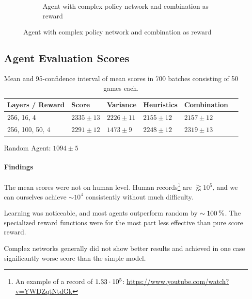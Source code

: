 \documentclass[11pt, fleqn]{article}
\begin{document}
\begin{figure}[h!]
\begin{subfigure}[t]{0.4\linewidth}
		\caption{Agent with complex policy network and combination as reward}
	\end{subfigure}
\end{figure}

\subsection*{Agent Evaluation Scores}
\begin{table}[H]
	\centering
	\begin{tabular}{@{}l|lllll@{}}
		\toprule
		Layers / Reward& Score & Variance & Heuristics & Combination  \\ \midrule 
		256, 16, 4       &   $2335\pm 13$    & $2226\pm 11$       & $2155 \pm 12$ & $2157\pm 12$                                                                                        \\
		256, 100, 50, 4 &  $2291 \pm 12$    &          $1473 \pm 9$&            $2248 \pm 12$ &                                             $2319 \pm 13$                 \\ \bottomrule
	\end{tabular}
\caption*{Mean and 95\pro-confidence interval of mean scores in 700 batches consisting of 50 games each.}
\end{table}\noindent
Random Agent: $1094 \pm 5$
\paragraph{Findings}
The mean scores were not on human level. Human records\footnote{An example of a record of $1.33\cdot10^{5}$: \url{https://www.youtube.com/watch?v=YWDZqtNtdGk}} are $\gtrapprox 10^5$, and we can ourselves achieve $\sim10^4$ consistently without much difficulty.

Learning was noticeable, and most agents outperform random by $\sim 100 \:\text{\%{}}$. The specialized reward functions were for the most part less effective than pure score reward.

Complex networks generally did not show better results and achieved in one case significantly worse score than the simple model.


\end{document}
